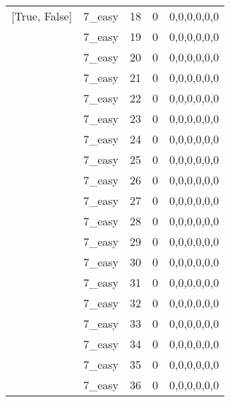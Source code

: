 \begin{tabular}{llrrl}
 [True, False]   & 7\_easy              &            18 &                     0 & 0,0,0,0,0,0   \\
 [True, False]   & 7\_easy              &            19 &                     0 & 0,0,0,0,0,0   \\
 [True, False]   & 7\_easy              &            20 &                     0 & 0,0,0,0,0,0   \\
 [True, False]   & 7\_easy              &            21 &                     0 & 0,0,0,0,0,0   \\
 [True, False]   & 7\_easy              &            22 &                     0 & 0,0,0,0,0,0   \\
 [True, False]   & 7\_easy              &            23 &                     0 & 0,0,0,0,0,0   \\
 [True, False]   & 7\_easy              &            24 &                     0 & 0,0,0,0,0,0   \\
 [True, False]   & 7\_easy              &            25 &                     0 & 0,0,0,0,0,0   \\
 [True, False]   & 7\_easy              &            26 &                     0 & 0,0,0,0,0,0   \\
 [True, False]   & 7\_easy              &            27 &                     0 & 0,0,0,0,0,0   \\
 [True, False]   & 7\_easy              &            28 &                     0 & 0,0,0,0,0,0   \\
 [True, False]   & 7\_easy              &            29 &                     0 & 0,0,0,0,0,0   \\
 [True, False]   & 7\_easy              &            30 &                     0 & 0,0,0,0,0,0   \\
 [True, False]   & 7\_easy              &            31 &                     0 & 0,0,0,0,0,0   \\
 [True, False]   & 7\_easy              &            32 &                     0 & 0,0,0,0,0,0   \\
 [True, False]   & 7\_easy              &            33 &                     0 & 0,0,0,0,0,0   \\
 [True, False]   & 7\_easy              &            34 &                     0 & 0,0,0,0,0,0   \\
 [True, False]   & 7\_easy              &            35 &                     0 & 0,0,0,0,0,0   \\
 [True, False]   & 7\_easy              &            36 &                     0 & 0,0,0,0,0,0   \\

\end{tabular}
